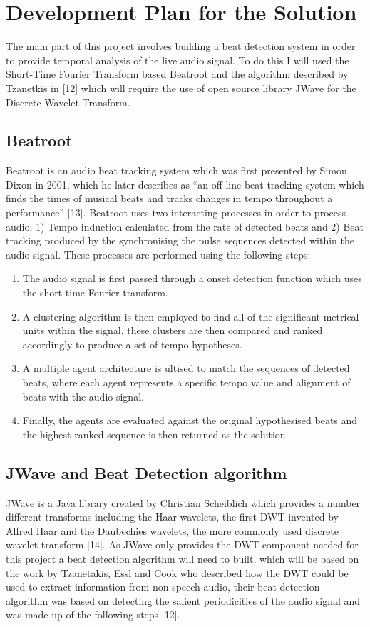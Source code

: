 \documentclass[a4paper, 11pt]{article}
\begin{document}
\section{Development Plan for the Solution}

The main part of this project involves building a beat detection system in order to provide temporal analysis of the live audio signal. To do this I will used the Short-Time Fourier Transform based Beatroot and the algorithm described by Tzanetkis in [12] which will require the use of open source library JWave for the Discrete Wavelet Transform. 

\subsection{Beatroot}
Beatroot is an audio beat tracking system which was first presented by Simon Dixon in 2001, which he later describes as ``an off-line beat tracking system which finds the times of musical beats and tracks changes in tempo throughout a performance'' [13]. Beatroot uses two interacting processes in order to process audio; 1) Tempo induction calculated from the rate of detected beats and 2) Beat tracking produced by the synchronising the pulse sequences detected within the audio signal. These processes are performed using the following steps:

\begin{enumerate}
\item The audio signal is first passed through a onset detection function which uses the short-time Fourier transform. 
\item A clustering algorithm is then employed to find all of the significant metrical units within the signal, these clusters are then compared and ranked accordingly to produce a set of tempo hypotheses.
\item A multiple agent architecture is ultised to match the sequences of detected beats, where each agent represents a specific tempo value and alignment of beats with the audio signal.
\item Finally, the agents are evaluated against the original hypothesised beats and the highest ranked sequence is then returned as the solution.
\end{enumerate}

\subsection{JWave and Beat Detection algorithm}
JWave is a Java library created by Christian Scheiblich which provides a number different transforms including the Haar wavelets, the first DWT invented by Alfred Haar and the Daubechies wavelets, the more commonly used discrete wavelet transform [14]. As JWave only provides the DWT component needed for this project a beat detection algorithm will need to built, which will be based on the work by Tzanetakis, Essl and Cook who described how the DWT could be used to extract information from non-speech audio, their beat detection algorithm was based on detecting the salient periodicities of the audio signal and was made up of the following steps [12]. 
\end{document}
